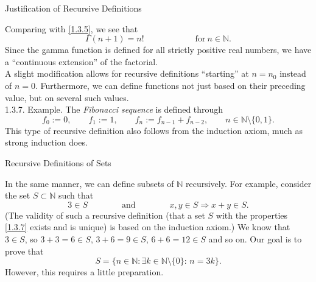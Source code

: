 \documentclass[smaller,hyperref={CJKbookmarks=true}]{beamer}
\newcommand{\N}{\mathbb{N}} \newcommand{\Z}{\mathbb{Z}} \newcommand{\Q}{\mathbb{Q}}
\begin{document}
\begin{frame}[t]{Justification of Recursive Definitions}
\begin{spacing}{1.05}
Comparing with \eqref{1.3.5}, we see that
\[\Gamma(n+1)=n!\qquad\qquad\qquad
\text{for}~n\in\N.\]
Since the gamma function is defined for all strictly positive real numbers,
we have a ``continuous extension'' of the factorial.\\[5pt]
A slight modification allows for recursive definitions ``starting'' at $n=n_0$ instead of $n=0$. Furthermore, we can define functions not just based on
their preceding value, but on several such values.\\[5pt]
\alert{1.3.7. Example.} The \emph{Fibonacci sequence }is defined through
\[f_0:=0,\qquad f_1:=1,\qquad f_n:=f_{n-1}+f_{n-2},\qquad n\in\N\setminus\{0,1\}.\]
This type of recursive definition also follows from the induction axiom,
much as strong induction does.
\end{spacing}
\end{frame}
\begin{frame}[c]{Recursive Definitions of Sets}
\begin{spacing}{1.1}
In the same manner, we can define subsets of $\N$ recursively. For example, consider the set $S\subset\N$ such that
\begin{equation}\label{1.3.7}
  3\in S\qquad\qquad\text{and}\qquad\qquad
  x,y\in S\Rightarrow x+y\in S.
\end{equation}
(The validity of such a recursive definition (that a set $S$ with the
properties \eqref{1.3.7} exists and is unique) is based on the induction axiom.) We know that $3\in S$, so $3+3=6\in S,\,3+6=9\in S,\,6+6=12\in S$ and so on. Our goal is to prove that
\[S=\{n\in\N\!:\exists k\in\N\setminus\{0\}\!:\,n=3k\}.\]
However, this requires a little preparation.
\end{spacing}
\end{frame}
\end{document}
